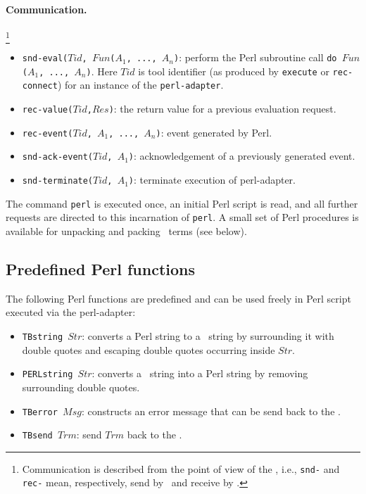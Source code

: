\paragraph{Communication.} \hspace{-0.3cm}\footnote{Communication is described
from the point of view of the \TB, i.e., {\tt snd-} and {\tt rec-}
mean, respectively, send by \TB\ and receive by \TB.}

\begin{itemize}
\item {\tt snd-eval($Tid$, $Fun$($A_1$, ..., $A_n$)}: perform the Perl subroutine call
{\tt do $Fun$($A_1$,  ..., $A_n$)}. Here $Tid$ is tool identifier 
(as produced by {\tt execute} or {\tt rec-connect}) for an instance of the {\tt perl-adapter}.
\item {\tt rec-value($Tid$,$Res$)}: the return value for a previous evaluation request.
\item {\tt rec-event($Tid$, $A_1$, ..., $A_n$)}: event generated by Perl.
\item {\tt snd-ack-event($Tid$, $A_1$)}: acknowledgement of
a previously generated event.
\item {\tt snd-terminate($Tid$, $A_1$)}: terminate execution of perl-adapter.
\end{itemize}

\noindent The command {\tt perl} is executed once, an initial Perl script
is read, and all further requests are directed to this incarnation
of {\tt perl}. A small set of Perl procedures is available for
unpacking and packing \TB\ terms (see below).

\subsection{\label{Perl-functions}Predefined Perl functions}
The following Perl functions are predefined and can be used freely in Perl
script executed via the perl-adapter:
\begin{itemize}
\item {\tt TBstring $Str$\/}: converts a Perl string to a \TB\ string by
surrounding it with double quotes and escaping double quotes occurring
inside $Str$.

\item {\tt PERLstring $Str$\/}: converts a \TB\ string into  a Perl string
by removing surrounding double quotes.

\item {\tt TBerror $Msg$\/}: constructs an error message that can be send back
to the \TB.

\item {\tt TBsend $Trm$\/}: send $Trm$ back to the \TB.

\end{itemize}

